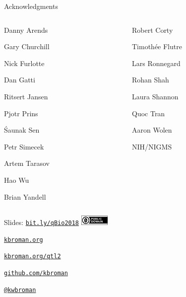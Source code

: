 \documentclass[12pt,t]{beamer}
\begin{document}
\begin{frame}[c]{Acknowledgments}

\begin{columns}[T]
  \begin{column}[T]{0.5\textwidth}
    \vspace{0pt}
\bi
\item[] Danny Arends
\item[] Gary Churchill
\item[] Nick Furlotte
\item[] Dan Gatti
\item[] Ritsert Jansen
\item[] Pjotr Prins
\item[] \'Saunak Sen
\item[] Petr Simecek
\item[] Artem Tarasov
\item[] Hao Wu
\item[] Brian Yandell
  \ei
  \end{column} \hfill
\begin{column}[T]{0.5\textwidth}
\vspace*{0mm}

  \bi
\item[] Robert Corty
\item[] Timoth\'ee Flutre
\item[] Lars Ronnegard
\item[] Rohan Shah
\item[] Laura Shannon
\item[] Quoc Tran
\item[] Aaron Wolen
\item[]
\item[] NIH/NIGMS
  \ei
\end{column}
\end{columns}

\end{frame}


\begin{frame}[c]{}

\Large

Slides: \href{http://bit.ly/qBio2018}{\tt bit.ly/qBio2018} \quad
\includegraphics[height=5mm]{Figs/cc-zero.png}

\vspace{7mm}

\href{http://kbroman.org}{\tt \lolit kbroman.org}

\vspace{7mm}

\href{http://kbroman.org/qtl2}{\tt kbroman.org/qtl2}

\vspace{7mm}

\href{https://github.com/kbroman}{\tt \lolit github.com/kbroman}

\vspace{7mm}

\href{https://twitter.com/kwbroman}{\tt \lolit @kwbroman}


\end{frame}
\end{document}
